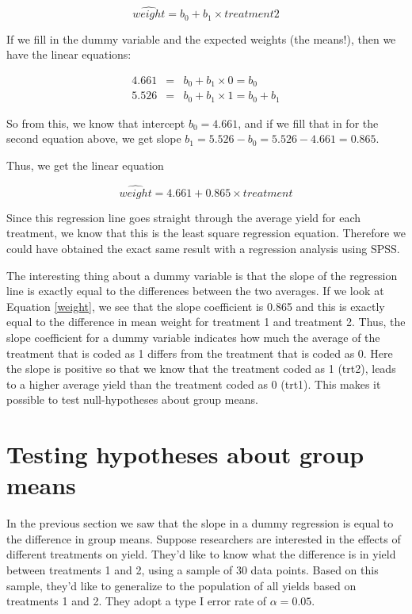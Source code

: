 \documentclass[]{report}\usepackage[]{graphicx}\usepackage[]{color}
\begin{document}
\begin{equation}
\widehat{weight} = b_0 + b_1 \times treatment2
\end{equation}

If we fill in the dummy variable and the expected weights (the means!), then we have the linear equations:


\begin{eqnarray}
4.661 &=& b_0 + b_1 \times 0 = b_0 \\
5.526 &=& b_0 + b_1 \times 1 = b_0 + b_1
\end{eqnarray}

So from this, we know that intercept $b_0 = 4.661$, and if we fill that in for the second equation above, we get slope $b_1 = 5.526-b_0= 5.526 -4.661= 0.865$.

Thus, we get the linear equation 

\begin{equation}
\label{weight}
\widehat{weight} = 4.661 + 0.865\times treatment
\end{equation}

Since this regression line goes straight through the average yield for each treatment, we know that this is the least square regression equation. Therefore we could have obtained the exact same result with a regression analysis using SPSS. 

The interesting thing about a dummy variable is that the slope of the regression line is exactly equal to the differences between the two averages. If we look at Equation \ref{weight}, we see that the slope coefficient is 0.865 and this is exactly equal to the difference in mean weight for treatment 1 and treatment 2. Thus, the slope coefficient for a dummy variable indicates how much the average of the treatment that is coded as 1 differs from the treatment that is coded as 0. Here the slope is positive so that we know that the treatment coded as 1 (trt2), leads to a higher average yield than the treatment coded as 0 (trt1). This makes it possible to test null-hypotheses about group means.

\section{Testing hypotheses about group means}

In the previous section we saw that the slope in a dummy regression is equal to the difference in group means. Suppose researchers are interested in the effects of different treatments on yield. They'd like to know what the difference is in yield between treatments 1 and 2, using a sample of 30 data points. Based on this sample, they'd like to generalize to the population of all yields based on treatments 1 and 2. They adopt a type I error rate of $\alpha=0.05$.
\end{document}
